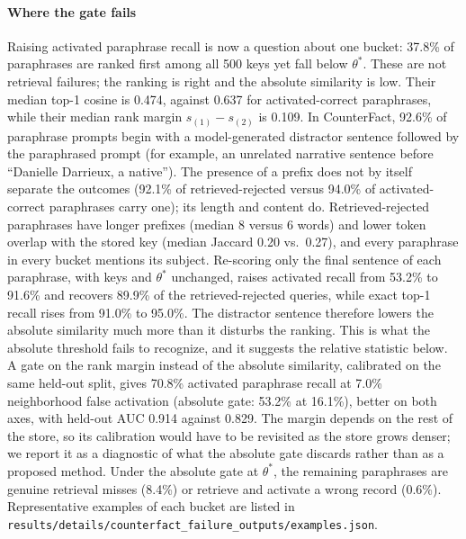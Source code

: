 \documentclass[preprint,12pt]{elsarticle}
\newif\ifmarkchanges
\newcommand{\rev}[1]{\ifmarkchanges{\color{blue}#1}\else#1\fi}
\begin{document}
\paragraph{Where the gate fails}
\rev{Raising activated paraphrase recall is now a question about one bucket: 37.8\% of paraphrases are ranked first among all 500 keys yet fall below $\theta^*$. These are not retrieval failures; the ranking is right and the absolute similarity is low. Their median top-1 cosine is 0.474, against 0.637 for activated-correct paraphrases, while their median rank margin $s_{(1)}-s_{(2)}$ is 0.109. In CounterFact, 92.6\% of paraphrase prompts begin with a model-generated distractor sentence followed by the paraphrased prompt (for example, an unrelated narrative sentence before ``Danielle Darrieux, a native''). The presence of a prefix does not by itself separate the outcomes (92.1\% of retrieved-rejected versus 94.0\% of activated-correct paraphrases carry one); its length and content do. Retrieved-rejected paraphrases have longer prefixes (median 8 versus 6 words) and lower token overlap with the stored key (median Jaccard 0.20 vs.\ 0.27), and every paraphrase in every bucket mentions its subject. Re-scoring only the final sentence of each paraphrase, with keys and $\theta^*$ unchanged, raises activated recall from 53.2\% to 91.6\% and recovers 89.9\% of the retrieved-rejected queries, while exact top-1 recall rises from 91.0\% to 95.0\%. The distractor sentence therefore lowers the absolute similarity much more than it disturbs the ranking. This is what the absolute threshold fails to recognize, and it suggests the relative statistic below. A gate on the rank margin instead of the absolute similarity, calibrated on the same held-out split, gives 70.8\% activated paraphrase recall at 7.0\% neighborhood false activation (absolute gate: 53.2\% at 16.1\%), better on both axes, with held-out AUC 0.914 against 0.829. The margin depends on the rest of the store, so its calibration would have to be revisited as the store grows denser; we report it as a diagnostic of what the absolute gate discards rather than as a proposed method. Under the absolute gate at $\theta^*$, the remaining paraphrases are genuine retrieval misses (8.4\%) or retrieve and activate a wrong record (0.6\%). Representative examples of each bucket are listed in \nolinkurl{results/details/counterfact_failure_outputs/examples.json}.}
\end{document}
